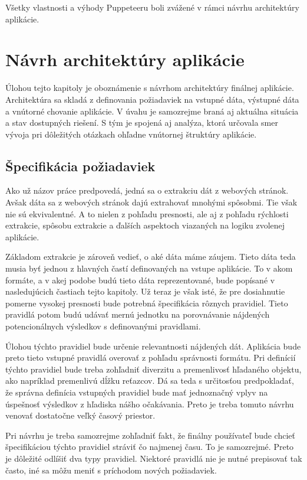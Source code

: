 Všetky vlastnosti a výhody Puppeteeru boli zvážené v rámci návrhu architektúry aplikácie.

\chapter{Návrh architektúry aplikácie}
\label{Navrh}
Úlohou tejto kapitoly je oboznámenie s návrhom architektúry finálnej aplikácie. Architektúra sa skladá z definovania požiadaviek na vstupné dáta, výstupné dáta a vnútorné chovanie aplikácie. V úvahu je samozrejme braná aj aktuálna situácia a stav dostupných riešení.  S tým je spojená aj analýza, ktorá určovala smer vývoja pri dôležitých otázkach ohľadne vnútornej štruktúry aplikácie.

\section{Špecifikácia požiadaviek}

Ako už názov práce predpovedá, jedná sa o extrakciu dát z webových stránok. Avšak dáta sa z webových stránok dajú extrahovať mnohými spôsobmi. Tie však nie sú ekvivalentné. A to nielen z pohľadu presnosti, ale aj z pohľadu rýchlosti extrakcie, spôsobu extrakcie a ďalších aspektoch viazaných na logiku zvolenej aplikácie.

Základom extrakcie je zároveň vedieť, o aké dáta máme záujem. Tieto dáta teda musia byť jednou z hlavných častí definovaných na vstupe aplikácie. To v akom formáte, a v akej podobe budú tieto dáta reprezentované, bude popísané v nasledujúcich častiach tejto kapitoly. Už teraz je však isté, že pre dosiahnutie pomerne vysokej presnosti bude potrebná špecifikácia rôznych pravidiel. Tieto pravidlá potom budú udávať mernú jednotku na porovnávanie nájdených potencionálnych výsledkov s definovanými pravidlami.

Úlohou týchto pravidiel bude určenie relevantnosti nájdených dát. Aplikácia bude preto tieto vstupné pravidlá overovať z pohľadu správnosti formátu. Pri definícií týchto pravidiel bude treba zohľadniť diverzitu a premenlivosť hľadaného objektu, ako napríklad premenlivú dĺžku reťazcov. Dá sa teda s určitosťou predpokladať, že správna definícia vstupných pravidiel bude mať jednoznačný vplyv na úspešnosť výsledkov z hľadiska nášho očakávania. Preto je treba tomuto návrhu venovať dostatočne veľký časový priestor.

Pri návrhu je treba samozrejme zohľadniť fakt, že finálny používateľ bude chcieť špecifikáciou týchto pravidiel stráviť čo najmenej času. To je samozrejmé. Preto je dôležité odlíšiť dva typy pravidiel. Niektoré pravidlá nie je nutné prepisovať tak často, iné sa môžu meniť s príchodom nových požiadaviek.

